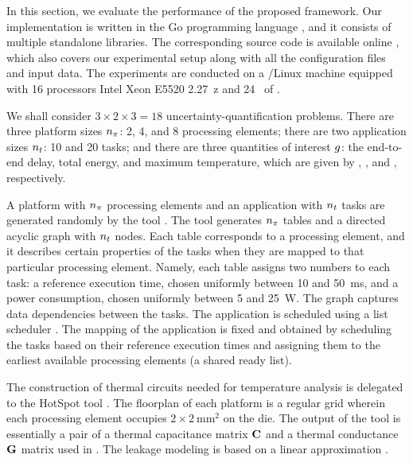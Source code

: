 In this section, we evaluate the performance of the proposed framework. Our
implementation is written in the Go programming language \cite{go}, and it
consists of multiple standalone libraries. The corresponding source code is
available online \cite{sources}, which also covers our experimental setup along
with all the configuration files and input data. The experiments are conducted
on a /Linux machine equipped with 16 processors Intel Xeon E5520
2.27~z and 24~ of .

We shall consider $3 \times 2 \times 3 = 18$ uncertainty-quantification
problems. There are three platform sizes ${n_\pi}$: 2, 4, and 8 processing elements;
there are two application sizes ${n_t}$: 10 and 20 tasks; and there are three
quantities of interest $g$: the end-to-end delay, total energy, and maximum
temperature, which are given by , ,
and , respectively.

A platform with ${n_\pi}$ processing elements and an application with ${n_t}$ tasks
are generated randomly by the  tool \cite{dick1998}. The tool
generates ${n_\pi}$ tables and a directed acyclic graph with ${n_t}$ nodes. Each table
corresponds to a processing element, and it describes certain properties of the
tasks when they are mapped to that particular processing element. Namely, each
table assigns two numbers to each task: a reference execution time, chosen
uniformly between 10 and 50~ms, and a power consumption, chosen uniformly
between 5 and 25~W. The graph captures data dependencies between the tasks. The
application is scheduled using a list scheduler \cite{adam1974}. The mapping of
the application is fixed and obtained by scheduling the tasks based on their
reference execution times and assigning them to the earliest available
processing elements (a shared ready list).

The construction of thermal  circuits needed for temperature analysis
is delegated to the HotSpot tool \cite{skadron2004}. The floorplan of each
platform is a regular grid wherein each processing element occupies $2 \times
2~\text{mm}^2$ on the die. The output of the tool is essentially a pair of a
thermal capacitance matrix $\mathbf{C}$ and a thermal conductance $\mathbf{G}$ matrix used in
. The leakage modeling is based on a linear approximation
\cite{yang2013, ukhov2012, liu2007}.


